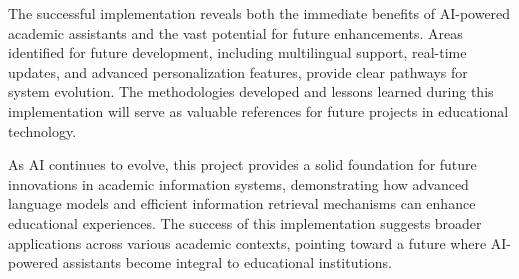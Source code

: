 \documentclass[12pt,a4paper]{report}
\begin{document}
The successful implementation reveals both the immediate benefits of AI-powered academic assistants and the vast potential for future enhancements. Areas identified for future development, including multilingual support, real-time updates, and advanced personalization features, provide clear pathways for system evolution. The methodologies developed and lessons learned during this implementation will serve as valuable references for future projects in educational technology.

As AI continues to evolve, this project provides a solid foundation for future innovations in academic information systems, demonstrating how advanced language models and efficient information retrieval mechanisms can enhance educational experiences. The success of this implementation suggests broader applications across various academic contexts, pointing toward a future where AI-powered assistants become integral to educational institutions.

% 
% 



\renewcommand{\bibname}{References}

\end{document}
